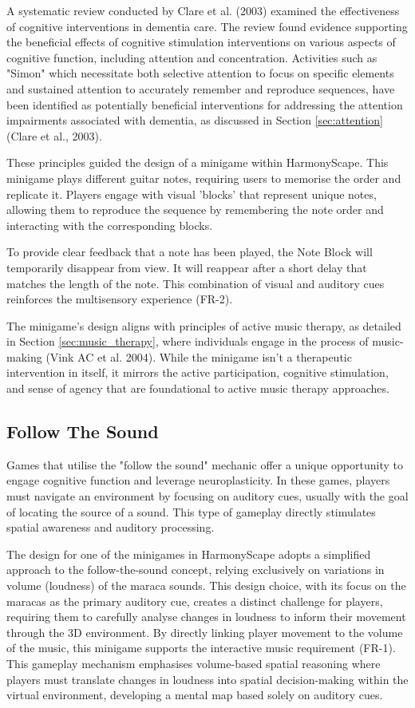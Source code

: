 \documentclass{l4proj}
\begin{document}
A systematic review conducted by Clare et al. (2003) examined the effectiveness of cognitive interventions in dementia care. The review found evidence supporting the beneficial effects of cognitive stimulation interventions on various aspects of cognitive function, including attention and concentration. Activities such as "Simon" which necessitate both selective attention to focus on specific elements and sustained attention to accurately remember and reproduce sequences, have been identified as potentially beneficial interventions for addressing the attention impairments associated with dementia, as discussed in Section \ref{sec:attention} (Clare et al., 2003).

These principles guided the design of a minigame within HarmonyScape. This minigame plays different guitar notes, requiring users to memorise the order and replicate it. Players engage with visual 'blocks' that represent unique notes, allowing them to reproduce the sequence by remembering the note order and interacting with the corresponding blocks.

To provide clear feedback that a note has been played, the Note Block will temporarily disappear from view. It will reappear after a short delay that matches the length of the note. This combination of visual and auditory cues reinforces the multisensory experience (FR-2).

The minigame's design aligns with principles of active music therapy, as detailed in Section \ref{sec:music_therapy}, where individuals engage in the process of music-making (Vink AC et al. 2004).  While the minigame isn't a therapeutic intervention in itself, it mirrors the active participation, cognitive stimulation, and sense of agency that are foundational to active music therapy approaches.

\subsection{Follow The Sound}
Games that utilise the "follow the sound" mechanic offer a unique opportunity to engage cognitive function and leverage neuroplasticity. In these games, players must navigate an environment by focusing on auditory cues, usually with the goal of locating the source of a sound. This type of gameplay directly stimulates spatial awareness and auditory processing.

The design for one of the minigames in HarmonyScape adopts a simplified approach to the follow-the-sound concept, relying exclusively on variations in volume (loudness) of the maraca sounds. This design choice, with its focus on the maracas as the primary auditory cue, creates a distinct challenge for players, requiring them to carefully analyse changes in loudness to inform their movement through the 3D environment. By directly linking player movement to the volume of the music, this minigame supports the interactive music requirement (FR-1). This gameplay mechanism emphasises volume-based spatial reasoning where players must translate changes in loudness into spatial decision-making within the virtual environment, developing a mental map based solely on auditory cues.
\end{document}
